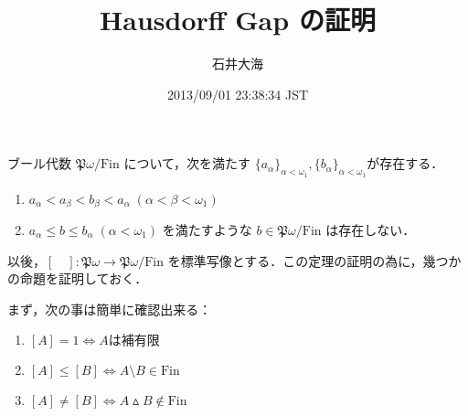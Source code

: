 \documentclass[a4j,lualatex,ja=standard]{bxjsarticle}
\title{Hausdorff Gap の証明}
\author{石井大海}
\date{2013/09/01 23:38:34 JST}
\begin{document}
\maketitle

\begin{theorem}[Hausdorff]
 ブール代数 $\mathfrak{P}\omega / \mathrm{Fin}$ について，次を満たす $\{a_\alpha\}_{\alpha < \omega_1}, \{b_\alpha\}_{\alpha < \omega_1}$が存在する．
 \begin{enumerate}
  \item $a_\alpha < a_\beta < b_\beta < a_\alpha\; (\alpha < \beta < \omega_1)$
  \item $a_\alpha \leq b \leq b_\alpha \; (\alpha < \omega_1)$ を満たすような $b \in \mathfrak{P}\omega / \mathrm{Fin}$ は存在しない．
 \end{enumerate}
\end{theorem}

以後，$[\quad]: \mathfrak{P}\omega \to \mathfrak{P}\omega/\mathrm{Fin}$ を標準写像とする．この定理の証明の為に，幾つかの命題を証明しておく．

まず，次の事は簡単に確認出来る：

\begin{fact}
 \begin{enumerate}[label=(\roman*)]
  \item $[A] = 1 \Leftrightarrow A \text{は補有限}$
  \item $[A] \leq [B] \Leftrightarrow A \setminus B \in \mathrm{Fin}$
  \item $[A] \neq [B] \Leftrightarrow A \vartriangle B \notin \mathrm{Fin}$
 \end{enumerate}
\end{fact}
\end{document}
